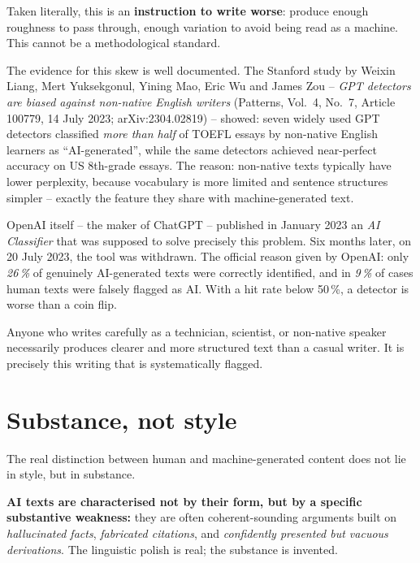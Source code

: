 Taken literally, this is an \textbf{instruction to write worse}:
produce enough roughness to pass through, enough variation to avoid
being read as a machine. This cannot be a methodological standard.

The evidence for this skew is well documented. The Stanford study
by Weixin Liang, Mert Yuksekgonul, Yining Mao, Eric Wu and James Zou
-- \emph{GPT detectors are biased against non-native English writers}
(Patterns, Vol.~4, No.~7, Article 100779, 14 July 2023;
arXiv:2304.02819) -- showed: seven widely used GPT detectors
classified \emph{more than half} of TOEFL essays by non-native
English learners as \enquote{AI-generated}, while the same detectors
achieved near-perfect accuracy on US 8th-grade essays. The reason:
non-native texts typically have lower perplexity, because vocabulary
is more limited and sentence structures simpler -- exactly the
feature they share with machine-generated text.

OpenAI itself -- the maker of ChatGPT -- published in January 2023
an \emph{AI Classifier} that was supposed to solve precisely this
problem. Six months later, on 20 July 2023, the tool was withdrawn.
The official reason given by OpenAI: only \emph{26\,\%} of
genuinely AI-generated texts were correctly identified, and in
\emph{9\,\%} of cases human texts were falsely flagged as AI. With
a hit rate below 50\,\%, a detector is worse than a coin flip.

Anyone who writes carefully as a technician, scientist, or
non-native speaker necessarily produces clearer and more structured
text than a casual writer. It is precisely this writing that is
systematically flagged.

\section{Substance, not style}

The real distinction between human and machine-generated content
does not lie in style, but in substance.

\textbf{AI texts are characterised not by their form, but by a
specific substantive weakness:} they are often coherent-sounding
arguments built on \emph{hallucinated facts}, \emph{fabricated
citations}, and \emph{confidently presented but vacuous derivations}.
The linguistic polish is real; the substance is invented.

